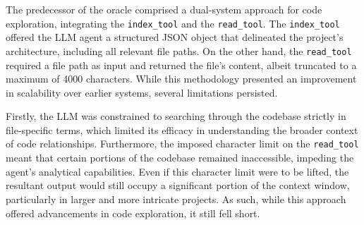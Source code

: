 \documentclass[
  a4paper,
  DIV=11,
  numbers=noendperiod]{scrreprt}
\theoremstyle{definition}
\theoremstyle{remark}
\begin{document}
\begin{enumerate}
  The predecessor of the oracle comprised a dual-system approach for
  code exploration, integrating the \texttt{index\_tool} and the
  \texttt{read\_tool}. The \texttt{index\_tool} offered the LLM agent a
  structured JSON object that delineated the project's architecture,
  including all relevant file paths. On the other hand, the
  \texttt{read\_tool} required a file path as input and returned the
  file's content, albeit truncated to a maximum of 4000 characters.
  While this methodology presented an improvement in scalability over
  earlier systems, several limitations persisted.

  Firstly, the LLM was constrained to searching through the codebase
  strictly in file-specific terms, which limited its efficacy in
  understanding the broader context of code relationships. Furthermore,
  the imposed character limit on the \texttt{read\_tool} meant that
  certain portions of the codebase remained inaccessible, impeding the
  agent's analytical capabilities. Even if this character limit were to
  be lifted, the resultant output would still occupy a significant
  portion of the context window, particularly in larger and more
  intricate projects. As such, while this approach offered advancements
  in code exploration, it still fell short.
\end{enumerate}
\end{document}
